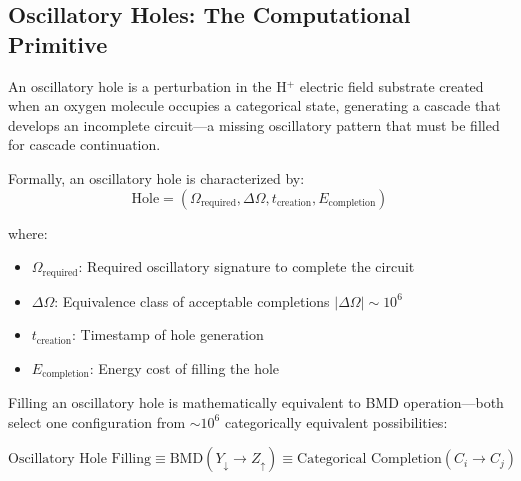 \subsection{Oscillatory Holes: The Computational Primitive}

\begin{definition}
An oscillatory hole is a perturbation in the H\(^+\) electric field substrate created when an oxygen molecule occupies a categorical state, generating a cascade that develops an incomplete circuit—a missing oscillatory pattern that must be filled for cascade continuation.

Formally, an oscillatory hole is characterized by:
\begin{equation}
\text{Hole} = (\Omega_{\text{required}}, \Delta\Omega, t_{\text{creation}}, E_{\text{completion}})
\end{equation}

where:
\begin{itemize}
\item $\Omega_{\text{required}}$: Required oscillatory signature to complete the circuit
\item $\Delta\Omega$: Equivalence class of acceptable completions $|\Delta\Omega| \sim 10^6$
\item $t_{\text{creation}}$: Timestamp of hole generation
\item $E_{\text{completion}}$: Energy cost of filling the hole
\end{itemize}
\end{definition}

\begin{theorem}
\label{thm:hole_bmd_equivalence}
Filling an oscillatory hole is mathematically equivalent to BMD operation—both select one configuration from $\sim 10^6$ categorically equivalent possibilities:

\begin{equation}
\text{Oscillatory Hole Filling} \equiv \text{BMD}(Y_{\downarrow} \to Z_{\uparrow}) \equiv \text{Categorical Completion}(C_i \to C_j)
\end{equation}
\end{theorem}

